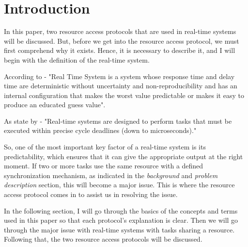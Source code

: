 \section{Introduction}

In this paper, two resource access protocols that are  used in real-time systems will be discussed. But, before we get into the resource access protocol, we must first comprehend why it exists. Hence, it is necessary to describe it, and I will begin with the definition of the real-time system.\par 

According to \cite{b1} - "Real Time System is a system whose response time and delay time are deterministic without uncertainty and non-reproducibility and has an internal configuration that makes the worst value predictable or makes it easy to produce an educated guess value".\par

As state by \cite{b2} - "Real-time systems are designed to perform tasks that must be executed within precise cycle deadlines (down to microseconds)."

So, one of the most important key factor of a real-time system is its predictability, which ensures that it can give the appropriate output at the right moment. If two or more tasks use the same resource with a defined synchronization mechanism, as indicated in the \textit{background} and \textit{problem description} section, this will become a major issue. This is where the resource access protocol comes in to assist us in resolving the issue. \par

In the following section, I will go through the basics of the concepts and terms used in this paper so that each protocol's explanation is clear. Then we will go through the major issue with real-time systems with tasks sharing a resource. Following that, the two resource access protocols will be discussed.\par
 





